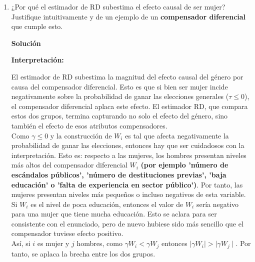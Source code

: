 \documentclass[a4paper, answers, addpoints, 11pt]{exam}
\newenvironment{solucion}{%
  \begin{mdframed}[
    backgroundcolor=blue!5,    %
    linecolor=blue!50,          %
    linewidth=2pt,              %
    leftmargin=10pt,            %
    rightmargin=8pt,           %
    topline=true,              %
    bottomline=true,            %
    roundcorner=10pt,           %
    innerleftmargin=10pt,       %
    innerrightmargin=10pt,      %
    innerbottommargin=10pt,     %
    innertopmargin=10pt         %
  ]%
  \begin{tcolorbox}[colframe=blue!50!black, colback=blue!50, coltitle=white, sharp corners=all, boxrule=1mm, width=\textwidth, halign=left, valign=center, top=0mm, bottom=0mm, left=0mm, right=0mm] \textbf{Solución} \end{tcolorbox} }{\end{mdframed}}
\begin{document}
\begin{enumerate}[resume]
\begin{enumerate}
\begin{solucion}
\begin{mdframed}[backgroundcolor=moraditoClaro]
\begin{proof}
Esta expresión proviene directamente del proyector de mínimos cuadrados de \( W_i - W_j\) sobre \( z \) en el contexto de variables normales multivariadas.  Como \( \mathbb{E}[ W_i - W_j] = 0 , z_0=0 \), la fórmula se reduce a:
\[
\mathbb{E}[ W_i - W_j \mid z = 0] = \frac{\text{Cov}( W_i - W_j, z)}{\text{Var}(z)} (-\mathbb{E}[z])
\]

 \end{proof}

\end{mdframed}
\end{solucion}
        \item ¿Por qué  el estimador de RD subestima el efecto causal de ser mujer? Justifique intuitivamente y de un ejemplo de un \textbf{compensador diferencial} que cumple esto.
        \begin{solucion}
\textbf{Interpretación:} %

El estimador de RD subestima la magnitud del efecto causal del género por causa del compensador diferencial. Esto es que si bien ser mujer incide negativamente sobre la probabilidad de ganar las elecciones generales ($\tau \leq 0$), el compensador diferencial aplaca este efecto. El estimador RD, que compara estos dos grupos, termina capturando no solo el efecto del género, sino también el efecto de esos atributos compensadores.\\

 Como $\gamma \leq 0$ y la construcción de $W_i$ es tal que afecta negativamente la probabilidad de ganar las elecciones, entonces hay que ser cuidadosos con la interpretación. Esto es:  respecto a las mujeres, los hombres presentan niveles más altos del compensador diferencial $W_i$ \textbf{(por ejemplo 'número de escándalos públicos', 'número de destituciones previas', 'baja educación' o 'falta de experiencia en sector público')}. Por tanto, las mujeres presentan niveles más pequeños o incluso negativos de esta variable. Si $W_i$ es el nivel de poca educación, entonces el valor de $W_i$ sería negativo para una mujer que tiene mucha educación. Esto se aclara para ser consistente con el enunciado, pero de nuevo hubiese sido más sencillo que el compensador tuviese efecto positivo.\\
 
Así, si $i$ es mujer y $j$ hombres, como $\gamma W_i  < \gamma W_j $ entonces $\mid \gamma W_i \mid > \mid \gamma W_j \mid$. Por tanto, se aplaca la brecha entre los dos grupos.  \\


\end{solucion}
\end{enumerate}
\end{enumerate}
\end{document}
